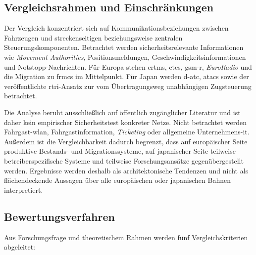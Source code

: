 \documentclass[runningheads]{res/llncs}
\begin{document}
\subsection{Vergleichsrahmen und Einschränkungen}
\label{sec:Vergleichsrahmen_und_Einschränkungen}

Der Vergleich konzentriert sich auf Kommunikationsbeziehungen zwischen Fahrzeugen und streckenseitigen beziehungsweise zentralen Steuerungskomponenten. Betrachtet werden sicherheitsrelevante Informationen wie \textit{Movement Authorities}, Positionsmeldungen, Geschwindigkeitsinformationen und Notstopp-\linebreak Nachrichten. Für Europa stehen \gls{ertms}, \gls{etcs}, \gls{gsm-r}, \textit{EuroRadio} und die Migration zu \gls{frmcs} im Mittelpunkt. Für Japan werden \gls{d-atc}, \gls{atacs} sowie der veröffentlichte \gls{rtri}-Ansatz zur vom Übertragungsweg unabhängigen Zugsteuerung betrachtet.

Die Analyse beruht ausschließlich auf öffentlich zugänglicher Literatur und ist daher kein empirischer Sicherheitstest konkreter Netze. Nicht betrachtet werden Fahrgast-\gls{wlan}, Fahrgastinformation, \textit{Ticketing} oder allgemeine Unternehmens-\gls{it}. Außerdem ist die Vergleichbarkeit dadurch begrenzt, dass auf europäischer Seite produktive Bestands- und Migrationssysteme, auf japanischer Seite teilweise betreiberspezifische Systeme und teilweise Forschungsansätze gegenübergestellt werden. Ergebnisse werden deshalb als architektonische Tendenzen und nicht als flächendeckende Aussagen über alle europäischen oder japanischen Bahnen interpretiert.

\subsection{Bewertungsverfahren}
\label{sec:Bewertungsverfahren}

Aus Forschungsfrage und theoretischem Rahmen werden fünf Vergleichskriterien abgeleitet:
\end{document}
